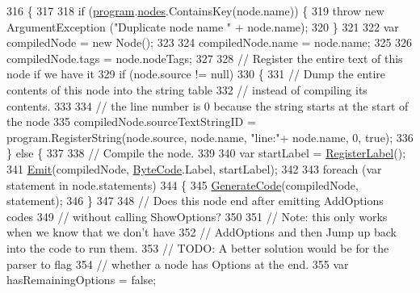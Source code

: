 \begin{DoxyCode}
316                                                     \{
317 
318             \textcolor{keywordflow}{if} (\hyperlink{a00032_aa1737da428ec7d597009661dd8a47829}{program}.\hyperlink{a00124_a3f4928a577c88263ad016be259b175c4}{nodes}.ContainsKey(node.name)) \{
319                 \textcolor{keywordflow}{throw} \textcolor{keyword}{new} ArgumentException (\textcolor{stringliteral}{"Duplicate node name "} + node.name);
320             \}
321 
322             var compiledNode =  \textcolor{keyword}{new} Node();
323 
324             compiledNode.name = node.name;
325 
326             compiledNode.tags = node.nodeTags;
327 
328             \textcolor{comment}{// Register the entire text of this node if we have it}
329             \textcolor{keywordflow}{if} (node.source != null)
330             \{
331                 \textcolor{comment}{// Dump the entire contents of this node into the string table }
332                 \textcolor{comment}{// instead of compiling its contents.}
333 
334                 \textcolor{comment}{// the line number is 0 because the string starts at the start of the node}
335                 compiledNode.sourceTextStringID = program.RegisterString(node.source, node.name, \textcolor{stringliteral}{"line:"}+
      node.name, 0, \textcolor{keyword}{true});
336             \} \textcolor{keywordflow}{else} \{
337 
338                 \textcolor{comment}{// Compile the node.}
339 
340                 var startLabel = \hyperlink{a00032_a1bae0d8b701a59708641aa36ea971fa5}{RegisterLabel}();
341                 \hyperlink{a00032_a774e8c143cdda0584fcfdda98626a83c}{Emit}(compiledNode, \hyperlink{a00029_ad5dfb6ee68ca7469623ad3e459f98894}{ByteCode}.Label, startLabel);
342 
343                 \textcolor{keywordflow}{foreach} (var statement \textcolor{keywordflow}{in} node.statements)
344                 \{
345                     \hyperlink{a00032_a006f3becd521cc179ba3d3352f6f930b}{GenerateCode}(compiledNode, statement);
346                 \}
347 
348                 \textcolor{comment}{// Does this node end after emitting AddOptions codes}
349                 \textcolor{comment}{// without calling ShowOptions?}
350 
351                 \textcolor{comment}{// Note: this only works when we know that we don't have}
352                 \textcolor{comment}{// AddOptions and then Jump up back into the code to run them.}
353                 \textcolor{comment}{// TODO: A better solution would be for the parser to flag}
354                 \textcolor{comment}{// whether a node has Options at the end.}
355                 var hasRemainingOptions = \textcolor{keyword}{false};

\end{DoxyCode}
